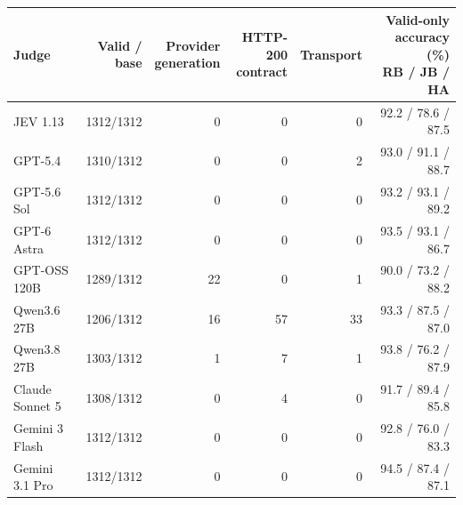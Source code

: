 \begin{tabular}{@{}lrrrrr@{}}
\toprule
Judge & Valid / base & \shortstack{Provider\\generation} & \shortstack{HTTP-200\\contract} & Transport & \shortstack{Valid-only accuracy (\%)\\RB / JB / HA} \\
\midrule
JEV 1.13 & 1312/1312 & 0 & 0 & 0 & 92.2 / 78.6 / 87.5 \\
GPT-5.4 & 1310/1312 & 0 & 0 & 2 & 93.0 / 91.1 / 88.7 \\
GPT-5.6 Sol & 1312/1312 & 0 & 0 & 0 & 93.2 / 93.1 / 89.2 \\
GPT-6 Astra & 1312/1312 & 0 & 0 & 0 & 93.5 / 93.1 / 86.7 \\
GPT-OSS 120B & 1289/1312 & 22 & 0 & 1 & 90.0 / 73.2 / 88.2 \\
Qwen3.6 27B & 1206/1312 & 16 & 57 & 33 & 93.3 / 87.5 / 87.0 \\
Qwen3.8 27B & 1303/1312 & 1 & 7 & 1 & 93.8 / 76.2 / 87.9 \\
Claude Sonnet 5 & 1308/1312 & 0 & 4 & 0 & 91.7 / 89.4 / 85.8 \\
Gemini 3 Flash & 1312/1312 & 0 & 0 & 0 & 92.8 / 76.0 / 83.3 \\
Gemini 3.1 Pro & 1312/1312 & 0 & 0 & 0 & 94.5 / 87.4 / 87.1 \\
\bottomrule
\end{tabular}
